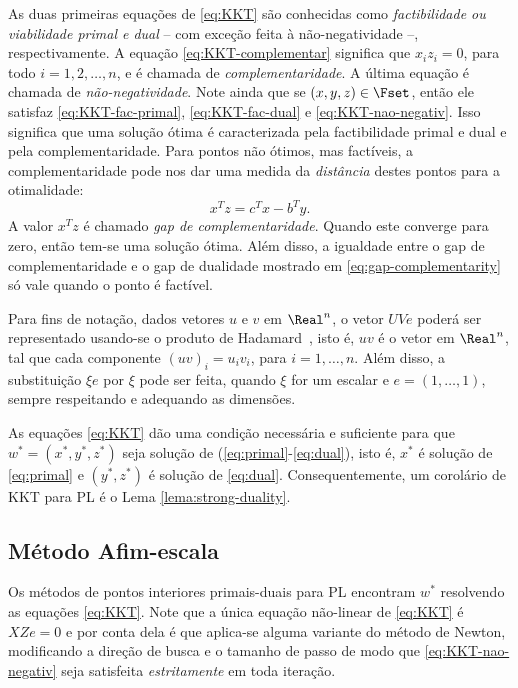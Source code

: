  As duas primeiras
equações de \eqref{eq:KKT} são conhecidas como \emph{factibilidade ou
viabilidade primal e dual} -- com exceção feita à não-negatividade  --,
respectivamente.
A equação \eqref{eq:KKT-complementar}
significa que $x_iz_i = 0$, para todo $i=1,2,\ldots,n$, e é chamada de \emph{complementaridade}. A última equação é chamada
de \emph{não-negatividade}. Note ainda que se $(x,y,z)\in\Fset$, então ele
satisfaz \eqref{eq:KKT-fac-primal}, \eqref{eq:KKT-fac-dual} e \eqref{eq:KKT-nao-negativ}.
Isso significa que uma solução ótima é caracterizada pela factibilidade primal e
dual e pela complementaridade. Para pontos não ótimos, mas factíveis, a
complementaridade pode nos dar uma medida da \emph{distância} destes pontos para a
otimalidade:
\begin{equation}
\label{eq:gap-complementarity}
x^Tz = c^Tx - b^Ty.
\end{equation}
A valor $x^Tz$ é chamado \emph{gap de complementaridade}. Quando este 
converge para zero, então tem-se uma solução ótima. Além disso, a igualdade
entre o gap de complementaridade e o gap de dualidade mostrado em
\eqref{eq:gap-complementarity} só vale quando o ponto é factível. 


\begin{obs}
 Para fins  de
notação, dados vetores $u$ e $v$ em $\Real^n$,  o vetor $UVe$ poderá
ser representado usando-se o produto de Hadamard~\cite[p.~455]{Horn:1985tf},
isto é, $uv$ é o vetor em $\Real^n$, tal que cada componente  $(uv)_i  = u_iv_i$, para $i=1,\ldots,n$.
Além disso, a substituição $\xi e$ por $\xi$ pode ser feita, quando  $\xi$ for
um escalar e $e = (1,\ldots,1)$, sempre respeitando e adequando as dimensões.
\end{obs}




As equações \eqref{eq:KKT} dão uma condição necessária e suficiente para que
$w^* = (x^*,y^*,z^*)$ seja solução de (\ref{eq:primal}-\ref{eq:dual}), isto é, $x^*$ é
solução de \eqref{eq:primal} e $(y^*,z^*)$ é solução de \eqref{eq:dual}. Consequentemente, um
corolário de \ac{KKT} para \ac{PL} é  o Lema \ref{lema:strong-duality}. 


\subsection{Método Afim-escala\label{sec:affine-scalling}}

Os métodos de pontos interiores primais-duais para \ac{PL}  encontram
$w^*$ resolvendo as equações \eqref{eq:KKT}. Note que a única equação não-linear de
\eqref{eq:KKT} é $XZe=0$ e por conta dela é que aplica-se alguma  variante do
método de Newton, modificando a direção de busca e o tamanho de passo de modo que
\eqref{eq:KKT-nao-negativ} seja  satisfeita \emph{estritamente} em toda iteração. 


